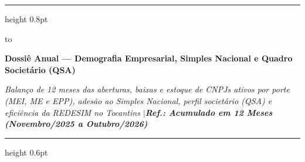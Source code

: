 \documentclass[10pt,a4paper]{article}
\begin{document}
\color{cinzatexto}

%
\par\vspace{2pt}%
{\color{coracento}\hrule height 0.8pt}%
\par\vspace{6pt}%
\noindent\hbox to %
\par\vspace{5pt}%
{\fontsize{14.5}{17.4}\selectfont\bfseries\color{corprimaria}Dossiê Anual — Demografia Empresarial, Simples Nacional e Quadro Societário (QSA)\par}%
\vspace{3pt}%
{\footnotesize\itshape\color{cinzasub}Balanço de 12 meses das aberturas, baixas e estoque de CNPJs ativos por porte (MEI, ME e EPP), adesão ao Simples Nacional, perfil societário (QSA) e eficiência da REDESIM no Tocantins \enspace$\vert$\enspace \textbf{\color{corprimaria}Ref.: Acumulado em 12 Meses (Novembro/2025 a Outubro/2026)}\par}%
\par\vspace{6pt}%
{\color{cinzaborda}\hrule height 0.6pt}%

\vspace{0.12cm}
\end{document}
